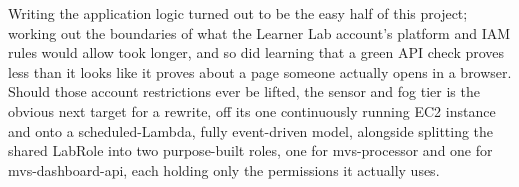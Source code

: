 \documentclass[conference]{IEEEtran}
\begin{document}
Writing the application logic turned out to be the easy half of this project; working out the boundaries of what the Learner Lab account's platform and IAM rules would allow took longer, and so did learning that a green API check proves less than it looks like it proves about a page someone actually opens in a browser. Should those account restrictions ever be lifted, the sensor and fog tier is the obvious next target for a rewrite, off its one continuously running EC2 instance and onto a scheduled-Lambda, fully event-driven model, alongside splitting the shared LabRole into two purpose-built roles, one for mvs-processor and one for mvs-dashboard-api, each holding only the permissions it actually uses.



\end{document}
